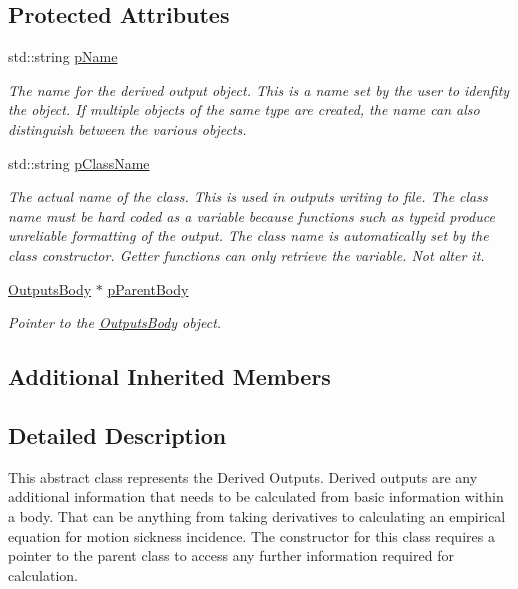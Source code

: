 \subsection*{Protected Attributes}
\begin{DoxyCompactItemize}
\item 
std\-::string \hyperlink{classosea_1_1ofreq_1_1_output_derived_a4ab81d265885b1c9fb9b4596dc9cd093}{p\-Name}
\begin{DoxyCompactList}\small\item\em The name for the derived output object. This is a name set by the user to idenfity the object. If multiple objects of the same type are created, the name can also distinguish between the various objects. \end{DoxyCompactList}\item 
std\-::string \hyperlink{classosea_1_1ofreq_1_1_output_derived_a50a1b7eb160d2e9c7a89b151df1dd008}{p\-Class\-Name}
\begin{DoxyCompactList}\small\item\em The actual name of the class. This is used in outputs writing to file. The class name must be hard coded as a variable because functions such as typeid produce unreliable formatting of the output. The class name is automatically set by the class constructor. Getter functions can only retrieve the variable. Not alter it. \end{DoxyCompactList}\item 
\hyperlink{classosea_1_1ofreq_1_1_outputs_body}{Outputs\-Body} $\ast$ \hyperlink{classosea_1_1ofreq_1_1_output_derived_a62d01bedaed33feb53c4108eaf8e4baf}{p\-Parent\-Body}
\begin{DoxyCompactList}\small\item\em Pointer to the \hyperlink{classosea_1_1ofreq_1_1_outputs_body}{Outputs\-Body} object. \end{DoxyCompactList}\end{DoxyCompactItemize}
\subsection*{Additional Inherited Members}


\subsection{Detailed Description}
This abstract class represents the Derived Outputs. Derived outputs are any additional information that needs to be calculated from basic information within a body. That can be anything from taking derivatives to calculating an empirical equation for motion sickness incidence. The constructor for this class requires a pointer to the parent class to access any further information required for calculation.

